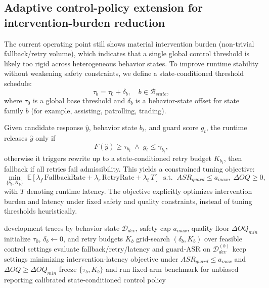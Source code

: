 ﻿\documentclass[a4paper,12pt]{article}
\begin{document}
\subsection{Adaptive control-policy extension for intervention-burden reduction}
The current operating point still shows material intervention burden (non-trivial fallback/retry volume), which indicates that a single global control threshold is likely too rigid across heterogeneous behavior states. To improve runtime stability without weakening safety constraints, we define a state-conditioned threshold schedule:
\begin{equation}
\tau_b=\tau_0+\delta_b,\quad b\in\mathcal{B}_{state},
\end{equation}
where \(\tau_0\) is a global base threshold and \(\delta_b\) is a behavior-state offset for state family \(b\) (for example, assisting, patrolling, trading).

Given candidate response \(\hat{y}\), behavior state \(b_t\), and guard score \(g_t\), the runtime releases \(\hat{y}\) only if
\begin{equation}
F(\hat{y})\ge \tau_{b_t}\;\land\; g_t\le \gamma_{b_t},
\end{equation}
otherwise it triggers rewrite up to a state-conditioned retry budget \(K_{b_t}\), then fallback if all retries fail admissibility. This yields a constrained tuning objective:
\begin{equation}
\min_{\{\delta_b,K_b\}} \;\mathbb{E}\!\left[\lambda_f\,\mathrm{FallbackRate}+\lambda_r\,\mathrm{RetryRate}+\lambda_t\,T\right]
\;\;\text{s.t.}\;\; ASR_{guard}\le a_{max},\; \Delta OQ\ge 0,
\end{equation}
with \(T\) denoting runtime latency. The objective explicitly optimizes intervention burden and latency under fixed safety and quality constraints, instead of tuning thresholds heuristically.

\begin{algorithm}[H]
\caption{State-conditioned control-threshold calibration}
\begin{algorithmic}[1]
\Require development traces by behavior state \(\mathcal{D}_{dev}\), safety cap \(a_{max}\), quality floor \(\Delta OQ_{min}\)
\State initialize \(\tau_0\), \(\delta_b\gets0\), and retry budgets \(K_b\)
  \State grid-search \((\delta_b,K_b)\) over feasible control settings
  \State evaluate fallback/retry/latency and guard-ASR on \(\mathcal{D}_{dev}^{(b)}\)
  \State keep settings minimizing intervention-latency objective under \(ASR_{guard}\le a_{max}\) and \(\Delta OQ\ge \Delta OQ_{min}\)
\EndFor
\State freeze \(\{\tau_b,K_b\}\) and run fixed-arm benchmark for unbiased reporting
\State \Return calibrated state-conditioned control policy
\end{algorithmic}
\end{algorithm}
\end{document}
